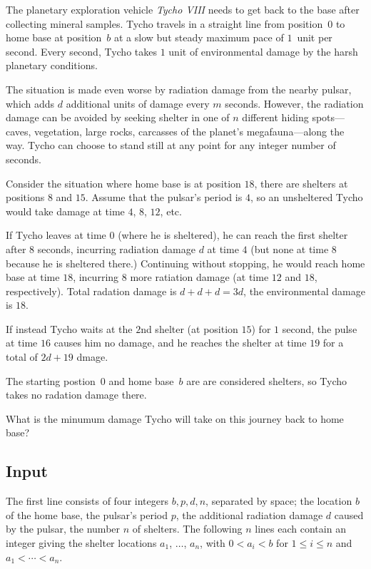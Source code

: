 
The planetary exploration vehicle \emph{Tycho VIII} needs to get back to the base after collecting mineral samples.
Tycho travels in a straight line from position~$0$ to home base at position~$b$ at a slow but steady maximum pace of $1$~unit per second.
Every second, Tycho takes $1$ unit of environmental damage by the harsh planetary conditions.

The situation is made even worse by radiation damage from the nearby pulsar, which adds $d$ additional units of damage every $m$ seconds.
However, the radiation damage can be avoided by seeking shelter in one of $n$ different hiding spots---caves, vegetation, large rocks, carcasses of the planet's megafauna---along the way.
Tycho can choose to stand still at any point for any integer number of seconds.

Consider the situation where home base is at position $18$, there are shelters at positions $8$ and $15$.
Assume that the pulsar's period is $4$, so an unsheltered Tycho would take damage at time $4$, $8$, $12$, etc.

If Tycho leaves at time $0$ (where he is sheltered), he can reach the first shelter after $8$ seconds, incurring radiation damage $d$ at time $4$ (but none at time $8$ because he is sheltered there.)
Continuing without stopping, he would reach home base at time $18$, incurring $8$ more ratiation damage (at time $12$ and $18$, respectively).
Total radation damage is $d+d+d=3d$, the environmental damage is $18$.

If instead Tycho waits at the $2$nd shelter (at position $15$) for $1$ second, the pulse at time $16$ causes him no damage, and he reaches the shelter at time $19$ for a total of $2d + 19$ dmage.

The starting postion~$0$ and home base~$b$ are are considered shelters, so Tycho takes no radation damage there.

\medskip
What is the minumum damage Tycho will take on this journey back to home base?

\subsection*{Input}

The first line consists of four integers $b,p,d,n$, separated by space;
the location $b$ of the home base,
the pulsar's period $p$,
the additional radiation damage $d$ caused by the pulsar,
the number $n$ of shelters.
The following $n$ lines each contain an integer giving the shelter locations $a_1$, $\ldots$, $a_n$, with 
$0<a_i< b$ for $1\leq i \leq n$ %
and 
$a_1<\cdots <a_n$. %

